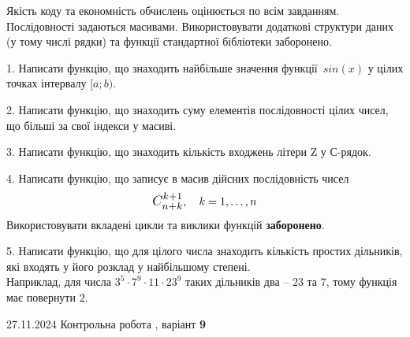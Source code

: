 \documentclass[12pt, ukrainian]{article}
\begin{document}
{{{{{{{%

{
Якість коду та економність обчислень оцінюється по всім завданням. Послідовності задаються масивами. Використовувати додаткові структури даних (у тому числі рядки) та функції стандартної бібліотеки заборонено.

\vspace{2mm}

\begin {large}
1. Написати функцію, що знаходить найбільше значення функції~$sin(x)$ у цілих точках інтервалу $[a; b)$.

\vspace{2mm}


2. Написати функцію, що знаходить суму елементів послідовності цілих чисел, що більші за свої індекси у масиві.

\vspace{2mm}


3. Написати функцію, що знаходить кількість входжень літери Z у С-рядок.

\vspace{2mm}


4. 
Написати функцію, що записує в масив дійсних послідовність чисел
$$\scalebox{1.2}{$C_{n+k}^{k+1}$}, \quad k=1,\ldots,n$$
Використовувати вкладені цикли та виклики функцій \textbf{заборонено}.

\vspace{2mm}


5. Написати функцію, що для цілого числа знаходить кількість простих дільників, які входять у його розклад у найбільшому степені. \\ Наприклад, для числа $3^5{\cdot}7^9{\cdot}11{\cdot}23^{9}$ таких дільників два – $23$ та $7$, тому функція має повернути $2$.

\vspace{2mm}

\end{large}
\newpage
{{27.11.2024 Контрольна робота , варіант  \No \textbf { 9 }\par}}

}}}}}}}}
\end{document}
